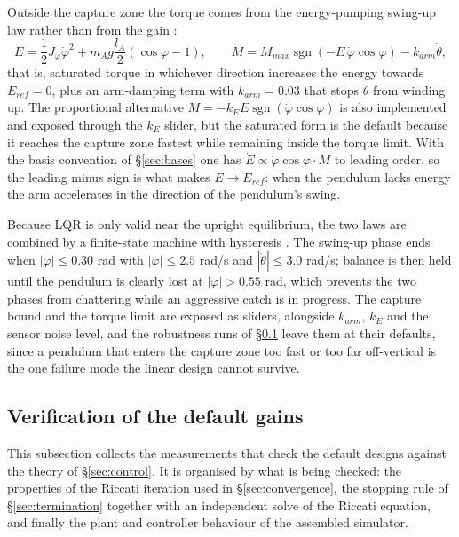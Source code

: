 \documentclass[12pt]{article}
\begin{document}
Outside the capture zone the torque comes from the energy-pumping swing-up law rather than from the gain \cite{AstromFuruta2000,Spong1996Energy}:
\[
E = \frac{1}{2}J_\varphi \dot{\varphi}^2 + m_A g \frac{l_A}{2}\left(\cos\varphi - 1\right),
\qquad
M = M_{max}\operatorname{sgn}\left(-E\,\dot{\varphi}\cos\varphi\right) - k_{arm}\dot{\theta},
\]
that is, saturated torque in whichever direction increases the energy towards $E_{ref} = 0$, plus an arm-damping term with $k_{arm} = 0.03$ that stops $\theta$ from winding up. The proportional alternative $M = -k_E E \operatorname{sgn}(\dot{\varphi}\cos\varphi)$ is also implemented and exposed through the $k_E$ slider, but the saturated form is the default because it reaches the capture zone fastest while remaining inside the torque limit. With the basis convention of \S\ref{sec:bases} one has $\dot{E} \propto \dot{\varphi}\cos\varphi \cdot M$ to leading order, so the leading minus sign is what makes $E \to E_{ref}$: when the pendulum lacks energy the arm accelerates in the direction of the pendulum's swing.

Because LQR is only valid near the upright equilibrium, the two laws are combined by a finite-state machine with hysteresis \cite{FantoniLozano2002}. The swing-up phase ends when $|\varphi| \le 0.30$ rad with $|\dot{\varphi}| \le 2.5$ rad/s and $|\dot{\theta}| \le 3.0$ rad/s; balance is then held until the pendulum is clearly lost at $|\varphi| > 0.55$ rad, which prevents the two phases from chattering while an aggressive catch is in progress. The capture bound and the torque limit are exposed as sliders, alongside $k_{arm}$, $k_E$ and the sensor noise level, and the robustness runs of \S\ref{sec:controller-tests} leave them at their defaults, since a pendulum that enters the capture zone too fast or too far off-vertical is the one failure mode the linear design cannot survive.

\subsection{Verification of the default gains}
\label{sec:controller-tests}

This subsection collects the measurements that check the default designs against the theory of \S\ref{sec:control}. It is organised by what is being checked: the properties of the Riccati iteration used in \S\ref{sec:convergence}, the stopping rule of \S\ref{sec:termination} together with an independent solve of the Riccati equation, and finally the plant and controller behaviour of the assembled simulator.
\end{document}
